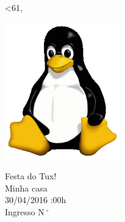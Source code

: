 \documentclass{article}
\newcounter{ingresso}
\begin{document}
\pagestyle{empty}

\loop\ifnum\value{ingresso}<61,
   \vspace{0.7cm}
   \begin{minipage}{10cm}
      \begin{center}
         \includegraphics[width=5cm]{../img/Tux.png}
      \end{center}
   \end{minipage}
   \begin{minipage}{12cm}
      \vspace{.45cm}
      \begin{center}
         \LARGE{Festa do Tux!}\\
         \LARGE{Minha casa}\\
         \LARGE{30/04/2016 :00h}\\
         Ingresso N$\ \mbox{}^{\circ}$ 
      \end{center}
      \vspace{.1cm}
   \end{minipage}
   \addtocounter{ingresso}{1}
\repeat
\end{document}
